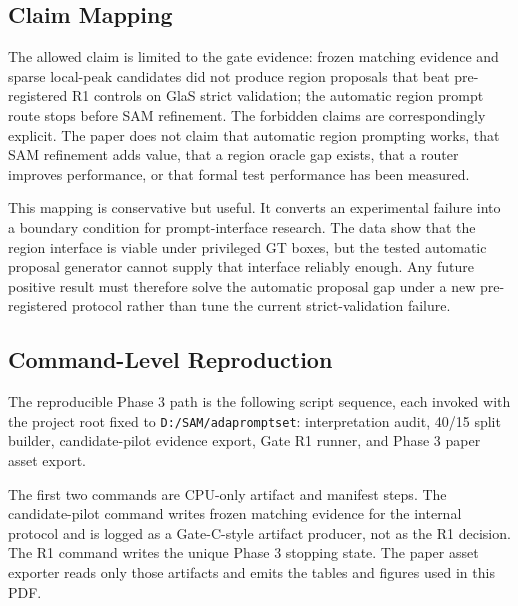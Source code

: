 \subsection{Claim Mapping}

The allowed claim is limited to the gate evidence: frozen matching evidence and sparse local-peak candidates did not produce region proposals that beat pre-registered R1 controls on GlaS strict validation; the automatic region prompt route stops before SAM refinement. The forbidden claims are correspondingly explicit. The paper does not claim that automatic region prompting works, that SAM refinement adds value, that a region oracle gap exists, that a router improves performance, or that formal test performance has been measured.

This mapping is conservative but useful. It converts an experimental failure into a boundary condition for prompt-interface research. The data show that the region interface is viable under privileged GT boxes, but the tested automatic proposal generator cannot supply that interface reliably enough. Any future positive result must therefore solve the automatic proposal gap under a new pre-registered protocol rather than tune the current strict-validation failure.

\subsection{Command-Level Reproduction}

The reproducible Phase 3 path is the following script sequence, each invoked with the project root fixed to \texttt{D:/SAM/adapromptset}: interpretation audit, 40/15 split builder, candidate-pilot evidence export, Gate R1 runner, and Phase 3 paper asset export.

The first two commands are CPU-only artifact and manifest steps. The candidate-pilot command writes frozen matching evidence for the internal protocol and is logged as a Gate-C-style artifact producer, not as the R1 decision. The R1 command writes the unique Phase 3 stopping state. The paper asset exporter reads only those artifacts and emits the tables and figures used in this PDF.
